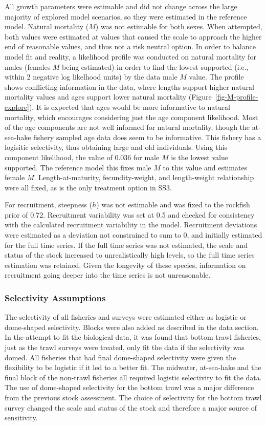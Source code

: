 \documentclass[
]{scrartcl}
\begin{document}
All growth parameters were estimable and did not change across the large
majority of explored model scenarios, so they were estimated in the
reference model. Natural mortality (\(M\)) was not estimable for both
sexes. When attempted, both values were estimated at values that caused
the scale to approach the higher end of reasonable values, and thus not
a risk neutral option. In order to balance model fit and reality, a
likelihood profile was conducted on natural mortality for males (females
\(M\) being estimated) in order to find the lowest supported (i.e.,
within 2 negative log likelhood units) by the data male \(M\) value. The
profile shows conflicting information in the data, where lengths support
higher natural mortality values and ages support lower natural mortality
(Figure~\ref{fig-M-profile-explore}). It is expected that ages would be
more informative to natural mortality, which encourages considering just
the age component likelihood. Most of the age components are not well
informed for natural mortality, though the at-sea-hake fishery sampled
age data does seem to be informative. This fishery has a logisitic
selectivity, thus obtaining large and old individuals. Using this
component likelihood, the value of 0.036 for male \(M\) is the lowest
value supported. The reference model this fixes male \(M\) to this value
and estimates female \(M\). Length-at-maturity, fecundity-weight, and
length-weight relationship were all fixed, as is the only treatment
option in SS3.

For recruitment, steepness (\(h\)) was not estimable and was fixed to
the rockfish prior of 0.72. Recruitment variability was set at 0.5 and
checked for consistency with the calculated recruitment variability in
the model. Recruitment deviations were estimated as a deviation not
constrained to sum to 0, and initially estimated for the full time
series. If the full time series was not estimated, the scale and status
of the stock increased to unrealistically high levels, so the full time
series estimation was retained. Given the longevity of these species,
information on recruitment going deeper into the time series is not
unreasonable.

\subsubsection{Selectivity Assumptions}\label{selectivity-assumptions}

The selectivity of all fisheries and surveys were estimated either as
logistic or dome-shaped selectivity. Blocks were also added as described
in the data section. In the attempt to fit the biological data, it was
found that bottom trawl fisheries, just as the trawl surveys were
treated, only fit the data if the selectivity was domed. All fisheries
that had final dome-shaped selectivity were given the flexibility to be
logistic if it led to a better fit. The midwater, at-sea-hake and the
final block of the non-trawl fisheries all required logistic selectivity
to fit the data. The use of dome-shaped selectivity for the bottom trawl
was a major difference from the previous stock assessment. The choice of
selectivity for the bottom trawl survey changed the scale and status of
the stock and therefore a major source of sensitivity.
\end{document}
